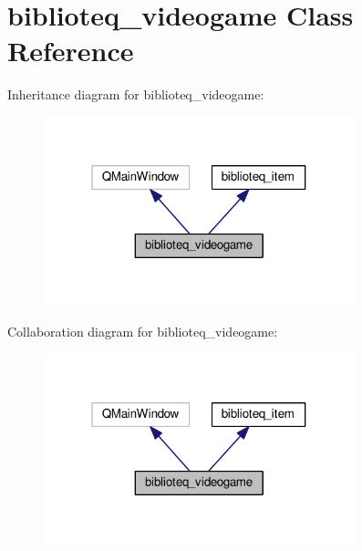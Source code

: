 \hypertarget{classbiblioteq__videogame}{}\section{biblioteq\+\_\+videogame Class Reference}
\label{classbiblioteq__videogame}


Inheritance diagram for biblioteq\+\_\+videogame\+:
\nopagebreak
\begin{figure}[H]
\begin{center}
\leavevmode
\includegraphics[width=256pt]{classbiblioteq__videogame__inherit__graph}
\end{center}
\end{figure}


Collaboration diagram for biblioteq\+\_\+videogame\+:
\nopagebreak
\begin{figure}[H]
\begin{center}
\leavevmode
\includegraphics[width=256pt]{classbiblioteq__videogame__coll__graph}
\end{center}
\end{figure}
